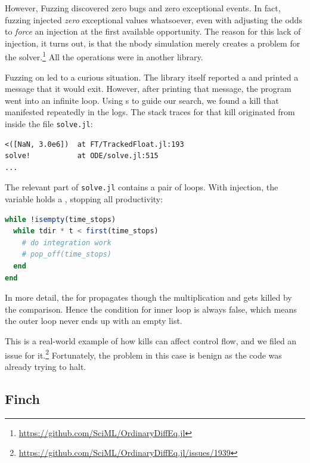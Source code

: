 \documentclass{juliacon}
\begin{document}
However, Fuzzing discovered zero bugs and zero exceptional events.
In fact, fuzzing injected \emph{zero} exceptional values whatsoever, even with adjusting the odds to \emph{force} an injection at the first available opportunity.
The reason for this lack of \NaN{} injection, it turns out, is that the nbody
simulation merely creates a problem for the 
solver.\footnote{\url{https://github.com/SciML/OrdinaryDiffEq.jl}}
All the \fp{} operations were in another library.

Fuzzing on  led to a curious situation.
The library itself reported a \NaN{} and printed a message that it would exit.
However, after printing that message, the program went into an infinite loop.
Using \CSTG{}s to guide our search, we found a \NaN{} kill that manifested repeatedly in the logs.
The stack traces for that kill originated from inside the file \texttt{solve.jl}:

\begin{lstlisting}
<([NaN, 3.0e6])  at FT/TrackedFloat.jl:193
solve!           at ODE/solve.jl:515
...
\end{lstlisting}

The relevant part of \texttt{solve.jl} contains a pair of loops.
With injection, the variable  holds a \NaN{},
stopping all productivity:


\begin{lstlisting}[language = Julia]
while !isempty(time_stops)
  while tdir * t < first(time_stops)
    # do integration work
    # pop_off(time_stops)
  end
end
\end{lstlisting}

In more detail, the \NaN{} for  propagates though the multiplication
and gets killed by the \code{<} comparison.
Hence the condition for inner  loop is always false,
which means the outer loop never ends up with an empty list.

This is a real-world example of how \NaN{} kills can affect control flow, and we filed
an issue for it.\footnote{\url{https://github.com/SciML/OrdinaryDiffEq.jl/issues/1939}}
Fortunately, the problem in this case is benign as the code was already trying to halt.


\subsection{Finch}
\label{s:finch}
\end{document}
